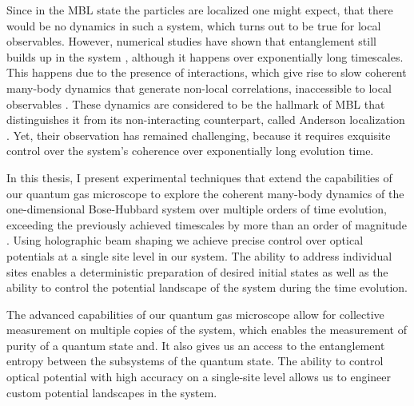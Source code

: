 Since in the MBL state the particles are localized one might expect, that there would be no dynamics in such a system, which turns out to be true for local observables. However, numerical studies have shown that entanglement still builds up in the system \cite{Znidaric2008, Bardarson2012}, although it happens over exponentially long timescales. This happens due to the presence of interactions, which give rise to slow coherent many-body dynamics that generate non-local correlations, inaccessible to local observables \cite{Serbyn2013, Serbyn2013a, Huse2014}. These dynamics are considered to be the hallmark of MBL that distinguishes it from its non-interacting counterpart, called Anderson localization \cite{Anderson1958}. Yet, their observation has remained challenging, because it requires exquisite control over the system's coherence over exponentially long evolution time.

In this thesis, I present experimental techniques that extend the capabilities of our quantum gas microscope \cite{Bakr2009} to explore the coherent many-body dynamics of the one-dimensional Bose-Hubbard system over multiple orders of time evolution, exceeding the previously achieved timescales by more than an order of magnitude \cite{Smith2015}. Using holographic beam shaping we achieve precise control over optical potentials at a single site level in our system. The ability to address individual sites enables a deterministic preparation of desired initial states as well as the ability to control the potential landscape of the system during the time evolution.

The advanced capabilities of our quantum gas microscope allow for collective measurement on multiple copies of the system, which enables the measurement of purity of a quantum state and. It also gives us an access to the entanglement entropy between the subsystems of the quantum state. The ability to control optical potential with high accuracy on a single-site level allows us to engineer custom potential landscapes in the system.

